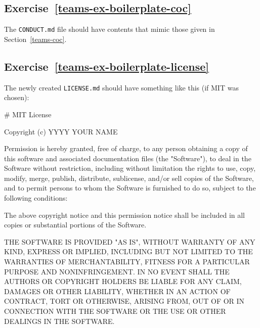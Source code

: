\documentclass[
]{krantz}
\makeatletter
\newenvironment{Shaded}{\begin{snugshade}}{\end{snugshade}}
\newcommand{\FunctionTok}[1]{\textcolor[rgb]{0.00,0.00,0.00}{#1}}
\newcommand{\NormalTok}[1]{#1}
\newenvironment{kframe}{%
\medskip{}
\setlength{\fboxsep}{.8em}
 \def\at@end@of@kframe{}%
 \ifinner\ifhmode%
  \def\at@end@of@kframe{\end{minipage}}%
  \begin{minipage}{\columnwidth}%
 \fi\fi%
 \def\FrameCommand##1{\hskip\@totalleftmargin \hskip-\fboxsep
 \colorbox{shadecolor}{##1}\hskip-\fboxsep
     \hskip-\linewidth \hskip-\@totalleftmargin \hskip\columnwidth}%
 \MakeFramed {\advance\hsize-\width
   \@totalleftmargin\z@ \linewidth\hsize
   \@setminipage}}%
 {\par\unskip\endMakeFramed%
 \at@end@of@kframe}
\renewenvironment{Shaded}{\begin{kframe}}{\end{kframe}}
\makeatother
\begin{document}
\hypertarget{exercise-refteams-ex-boilerplate-coc}{%
\subsection*{Exercise~\ref{teams-ex-boilerplate-coc}}\label{exercise-refteams-ex-boilerplate-coc}}


The \texttt{CONDUCT.md} file should have contents that mimic those given in Section~\ref{teams-coc}.

\hypertarget{exercise-refteams-ex-boilerplate-license}{%
\subsection*{Exercise~\ref{teams-ex-boilerplate-license}}\label{exercise-refteams-ex-boilerplate-license}}


The newly created \texttt{LICENSE.md} should have something like this
(if MIT was chosen):

\begin{Shaded}
\begin{Highlighting}[]
\FunctionTok{\# MIT License}

\NormalTok{Copyright (c) YYYY YOUR NAME }

\NormalTok{Permission is hereby granted, free of charge, to any person obtaining a copy}
\NormalTok{of this software and associated documentation files (the "Software"), to deal}
\NormalTok{in the Software without restriction, including without limitation the rights}
\NormalTok{to use, copy, modify, merge, publish, distribute, sublicense, and/or sell}
\NormalTok{copies of the Software, and to permit persons to whom the Software is}
\NormalTok{furnished to do so, subject to the following conditions:}

\NormalTok{The above copyright notice and this permission notice shall be included in all}
\NormalTok{copies or substantial portions of the Software.}

\NormalTok{THE SOFTWARE IS PROVIDED "AS IS", WITHOUT WARRANTY OF ANY KIND, EXPRESS OR}
\NormalTok{IMPLIED, INCLUDING BUT NOT LIMITED TO THE WARRANTIES OF MERCHANTABILITY,}
\NormalTok{FITNESS FOR A PARTICULAR PURPOSE AND NONINFRINGEMENT. IN NO EVENT SHALL THE}
\NormalTok{AUTHORS OR COPYRIGHT HOLDERS BE LIABLE FOR ANY CLAIM, DAMAGES OR OTHER}
\NormalTok{LIABILITY, WHETHER IN AN ACTION OF CONTRACT, TORT OR OTHERWISE, ARISING FROM,}
\NormalTok{OUT OF OR IN CONNECTION WITH THE SOFTWARE OR THE USE OR OTHER DEALINGS IN THE}
\NormalTok{SOFTWARE.}
\end{Highlighting}
\end{Shaded}
\end{document}
